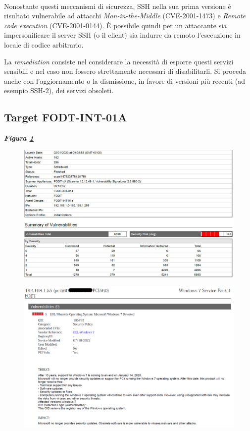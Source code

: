 \documentclass[target=bach,aauheader=]{thud}
\begin{document}
\\ Nonostante questi meccanismi di sicurezza, SSH nella sua prima versione è risultato vulnerabile ad attacchi \textit{Man-in-the-Middle} (CVE-2001-1473) e \textit{Remote code execution} (CVE-2001-0144). È possibile quindi per un attaccante sia impersonificare il server SSH (o il client) sia indurre da remoto l'esecuzione in locale di codice arbitrario. 


La \textit{remediation} consiste nel considerare la necessità di esporre questi servizi sensibili e nel caso non fossero strettamente necessari di disabilitarli. Si proceda anche con l’aggiornamento o la dismissione, in favore di versioni più recenti (ad esempio SSH-2), dei servizi obsoleti.

\subsection{Target FODT-INT-01A} \textbf{\textit{Figura \ref{fig:fodt-int-01a_1}}}

\begin{figure}[t]
    \centering
    \includegraphics[width=1\linewidth]{images/FODT-INT-01a_1.png}
    \caption{}
    \label{fig:fodt-int-01a_1}
\end{figure}


\begin{figure}[t]
    \centering
    \includegraphics[width=1\linewidth]{images/FODT-INT-01a_2.png}
    \caption{}
    \label{fig:fodt-int-01a_2}
\end{figure}
\end{document}
